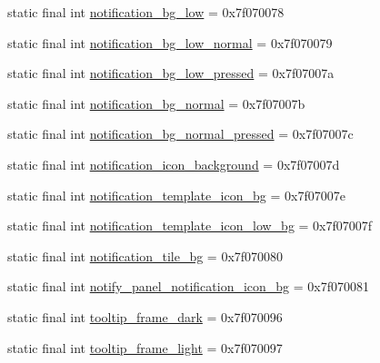 \begin{DoxyCompactItemize}
\item 
static final int \mbox{\hyperlink{classcom_1_1synnapps_1_1carouselview_1_1_r_1_1drawable_a00599c47f0368da0323210e07ecce7e3}{notification\+\_\+bg\+\_\+low}} = 0x7f070078
\item 
static final int \mbox{\hyperlink{classcom_1_1synnapps_1_1carouselview_1_1_r_1_1drawable_ae387329dc1dd1aaa2c5a0e308a20fad7}{notification\+\_\+bg\+\_\+low\+\_\+normal}} = 0x7f070079
\item 
static final int \mbox{\hyperlink{classcom_1_1synnapps_1_1carouselview_1_1_r_1_1drawable_a38c88fd288feedc6c68643921327c875}{notification\+\_\+bg\+\_\+low\+\_\+pressed}} = 0x7f07007a
\item 
static final int \mbox{\hyperlink{classcom_1_1synnapps_1_1carouselview_1_1_r_1_1drawable_a25375abba4e9859cd44cee40c3a3d6e2}{notification\+\_\+bg\+\_\+normal}} = 0x7f07007b
\item 
static final int \mbox{\hyperlink{classcom_1_1synnapps_1_1carouselview_1_1_r_1_1drawable_aaf0db1dafc34fe678c7aecc03235d7b2}{notification\+\_\+bg\+\_\+normal\+\_\+pressed}} = 0x7f07007c
\item 
static final int \mbox{\hyperlink{classcom_1_1synnapps_1_1carouselview_1_1_r_1_1drawable_a381693a734647b19bec5c73c8ce284e5}{notification\+\_\+icon\+\_\+background}} = 0x7f07007d
\item 
static final int \mbox{\hyperlink{classcom_1_1synnapps_1_1carouselview_1_1_r_1_1drawable_a46daa4d7dafe35fdafb4b75d0190d285}{notification\+\_\+template\+\_\+icon\+\_\+bg}} = 0x7f07007e
\item 
static final int \mbox{\hyperlink{classcom_1_1synnapps_1_1carouselview_1_1_r_1_1drawable_ab40a3f791dbde60bbccb6dd2fcdc5418}{notification\+\_\+template\+\_\+icon\+\_\+low\+\_\+bg}} = 0x7f07007f
\item 
static final int \mbox{\hyperlink{classcom_1_1synnapps_1_1carouselview_1_1_r_1_1drawable_a89d985d8a422f46f14641c2f3ae04604}{notification\+\_\+tile\+\_\+bg}} = 0x7f070080
\item 
static final int \mbox{\hyperlink{classcom_1_1synnapps_1_1carouselview_1_1_r_1_1drawable_a409d0ff0e319cc0345120b0dfe91e3cb}{notify\+\_\+panel\+\_\+notification\+\_\+icon\+\_\+bg}} = 0x7f070081
\item 
static final int \mbox{\hyperlink{classcom_1_1synnapps_1_1carouselview_1_1_r_1_1drawable_a559d1857e8cd5c2f4c263fd9b964863c}{tooltip\+\_\+frame\+\_\+dark}} = 0x7f070096
\item 
static final int \mbox{\hyperlink{classcom_1_1synnapps_1_1carouselview_1_1_r_1_1drawable_a78fe30cf04c463f9c93e80544eba061f}{tooltip\+\_\+frame\+\_\+light}} = 0x7f070097
\end{DoxyCompactItemize}

